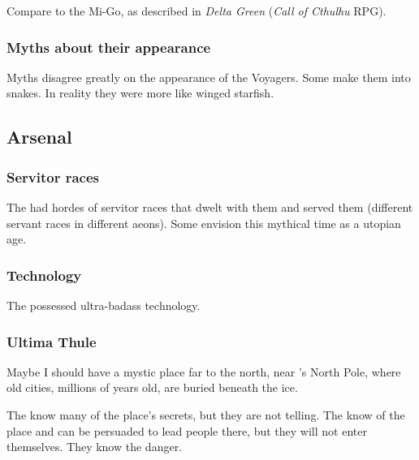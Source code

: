 Compare to the Mi-Go, as described in \emph{Delta Green} (\emph{Call of Cthulhu} RPG). 





\subsubsection{Myths about their appearance}
Myths disagree greatly on the appearance of the Voyagers. 
Some make them into snakes. 
In reality they were more like winged starfish. 









\subsection{Arsenal}





\subsubsection{Servitor races}
The \voyagers{} had hordes of servitor races that dwelt with them and served them (different servant races in different aeons). 
Some envision this mythical time as a utopian age. 





\subsubsection{Technology}
The \voyagers{} possessed ultra-badass technology.





\subsubsection{Ultima Thule}
Maybe I should have a mystic place far to the north, near \Miith{}'s North Pole, where old \voyager{} cities, millions of years old, are buried beneath the ice. 

The \nagalords{} know many of the place's secrets, but they are not telling. 
The \nagae{} know of the place and can be persuaded to lead people there, but they will not enter themselves. They know the danger. 

